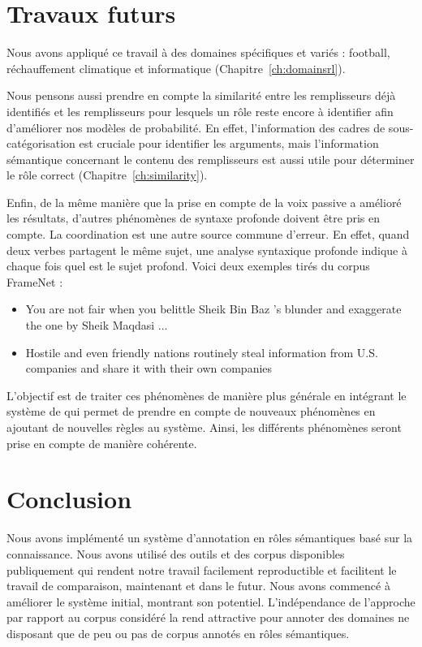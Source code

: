 \section{Travaux futurs}

Nous avons appliqué ce travail à des domaines spécifiques et variés : football,
réchauffement climatique et informatique (Chapitre~\ref{ch:domainsrl}).

Nous pensons aussi prendre en compte la similarité entre les remplisseurs déjà
identifiés et les remplisseurs pour lesquels un rôle reste encore à identifier
afin d'améliorer nos modèles de probabilité. En effet, l'information des cadres
de sous-catégorisation est cruciale pour identifier les arguments, mais
l'information sémantique concernant le contenu des remplisseurs est aussi utile
pour déterminer le rôle correct (Chapitre~\ref{ch:similarity}).

Enfin, de la même manière que la prise en compte de la voix passive a amélioré
les résultats, d'autres phénomènes de syntaxe profonde doivent être pris en
compte. La coordination est une autre source commune d'erreur. En effet, quand
deux verbes partagent le même sujet, une analyse syntaxique profonde indique à
chaque fois quel est le sujet profond. Voici deux exemples tirés du corpus
FrameNet :

\begin{itemize}
    \item You are not fair when you belittle Sheik Bin Baz 's blunder and
          exaggerate the one by Sheik Maqdasi ...
    \item Hostile and even friendly nations routinely steal information from
          U.S. companies and share it with their own companies
\end{itemize}

L'objectif est de traiter ces phénomènes de manière plus générale en intégrant
le système de \cite{ribeyre2013systeme} qui permet de prendre en compte de
nouveaux phénomènes en ajoutant de nouvelles règles au système. Ainsi, les
différents phénomènes seront prise en compte de manière cohérente.

\section{Conclusion}

Nous avons implémenté un système d'annotation en rôles sémantiques basé sur la
connaissance. Nous avons utilisé des outils et des corpus disponibles
publiquement qui rendent notre travail facilement reproductible et facilitent
le travail de comparaison, maintenant et dans le futur. Nous avons commencé à
améliorer le système initial, montrant son potentiel. L'indépendance de
l'approche par rapport au corpus considéré la rend attractive pour annoter des
domaines ne disposant que de peu ou pas de corpus annotés en rôles sémantiques.
